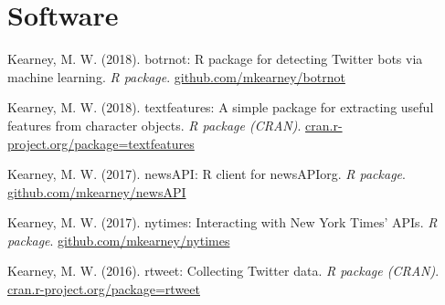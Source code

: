 \section{Software}
\begin{bibenum}

\item Kearney, M. W. (2018). botrnot: R package for detecting Twitter bots via machine learning.
\textit{R package}.
\href{https://github.com/mkearney/botrnot}{github.com/mkearney/botrnot}

\item Kearney, M. W. (2018). textfeatures: A simple package for extracting useful features from character objects.
\textit{R package (CRAN)}.
\href{http://cran.r-project.org/package=textfeatures}{cran.r-project.org/package=textfeatures}

\item Kearney, M. W. (2017). newsAPI: R client for newsAPIorg.
\textit{R package}.
\href{https://github.com/mkearney/newsAPI}{github.com/mkearney/newsAPI}

\item Kearney, M. W. (2017). nytimes: Interacting with New York Times' APIs.
\textit{R package}.
\href{https://github.com/mkearney/nytimes}{github.com/mkearney/nytimes}

\item Kearney, M. W. (2016). rtweet: Collecting Twitter data.
\textit{R package (CRAN)}.
\href{http://cran.r-project.org/package=rtweet}{cran.r-project.org/package=rtweet}
\end{bibenum}

